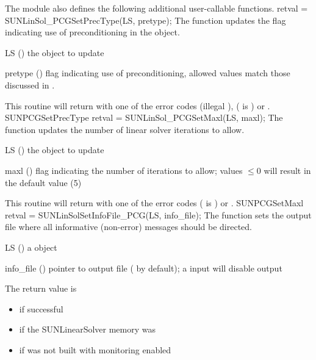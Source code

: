 The {\sunlinsolpcg} module also defines the following additional
user-callable functions.
%
%
{
  retval = SUNLinSol\_PCGSetPrecType(LS, pretype);
}
{
  The function  updates the flag
  indicating use of preconditioning in the {\sunlinsolpcg} object.
}
{
  \begin{args}[pretype]
  \item[LS] ()
    the {\sunlinsolpcg} object to update
  \item[pretype] ()
    flag indicating use of preconditioning, allowed
    values match those discussed in .
  \end{args}
}
{
  This routine will return with one of the error codes
   (illegal ), 
  ( is ) or .
}
{}
{SUNPCGSetPrecType}
%
%
{
  retval = SUNLinSol\_PCGSetMaxl(LS, maxl);
}
{
  The function  updates the number of
  linear solver iterations to allow.
}
{
  \begin{args}[maxl]
  \item[LS] ()
    the {\sunlinsolpcg} object to update
  \item[maxl] ()
    flag indicating the number of iterations to allow; values $\le0$
    will result in the default value (5)
  \end{args}
}
{
  This routine will return with one of the error codes
   ( is ) or .
}
{}
{SUNPCGSetMaxl}
%
%
{
  retval = SUNLinSolSetInfoFile\_PCG(LS, info\_file);
}
{
  The function  sets the
  output file where all informative (non-error) messages should be directed.
}
{
  \begin{args}
  \item[LS] ()
    a {\sunnonlinsol} object
  \item[info\_file] () pointer to output file ( by default);
    a  input will disable output
  \end{args}
}
{
  The return value is
  \begin{itemize}
    \item {} if successful
    \item {} if the SUNLinearSolver memory was 
    \item {} if {\sundials} was not built with monitoring enabled
  \end{itemize}
}
